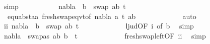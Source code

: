 \begin{isabellebody}
\ simp\isanewline
\isanewline
\ \ \ \ \ \ \ \ \ \isamarkupfalse%
\ {\isachardoublequoteopen}nabla\ {\isasymturnstile}\ b\ {\isasymsharp}\ swap\ {\isacharbrackleft}{\kern0pt}{\isacharparenleft}{\kern0pt}a{\isacharcomma}{\kern0pt}b{\isacharparenright}{\kern0pt}{\isacharbrackright}{\kern0pt}\ t{}{\isacharprime}{\kern0pt}{\isachardoublequoteclose}\ \isanewline
\ \ \ \ \ \ \ \ \ \ \ \isamarkupfalse%
\ {}{\isacharparenleft}{\kern0pt}{}{\isacharcomma}{\kern0pt}{}{\isacharcomma}{\kern0pt}{}{\isacharcomma}{\kern0pt}{}{\isacharparenright}{\kern0pt}\ equ{\isacharunderscore}{\kern0pt}abst{\isacharunderscore}{\kern0pt}aa{\isacharparenleft}{\kern0pt}{}{\isacharparenright}{\kern0pt}\ fresh{\isacharunderscore}{\kern0pt}swap{\isacharunderscore}{\kern0pt}eqvt{\isacharbrackleft}{\kern0pt}of\ nabla\ a\ t{}{\isacharprime}{\kern0pt}\ {\isacartoucheopen}{\isacharbrackleft}{\kern0pt}{\isacharparenleft}{\kern0pt}a{\isacharcomma}{\kern0pt}b{\isacharparenright}{\kern0pt}{\isacharbrackright}{\kern0pt}{\isacartoucheclose}{\isacharbrackright}{\kern0pt}\isanewline
\ \ \ \ \ \ \ \ \ \ \ \isamarkupfalse%
\ auto\isanewline
\ \ \ \ \ \ \ \ \ \isamarkupfalse%
\ \isamarkupfalse%
\ ii{\isacharcolon}{\kern0pt}\ {\isachardoublequoteopen}nabla\ {\isasymturnstile}\ b\ {\isasymsharp}\ swap\ {\isacharbrackleft}{\kern0pt}{\isacharparenleft}{\kern0pt}a{\isacharcomma}{\kern0pt}b{\isacharparenright}{\kern0pt}{\isacharbrackright}{\kern0pt}\ t{}{\isacharprime}{\kern0pt}{\isachardoublequoteclose}\isanewline
\ \ \ \ \ \ \ \ \ \ \ \isamarkupfalse%
\ l{}{\isacharunderscore}{\kern0pt}jud{\isacharbrackleft}{\kern0pt}OF\ i{\isacharcomma}{\kern0pt}\ of\ b{\isacharbrackright}{\kern0pt}\ \isamarkupfalse%
\ simp\isanewline
\ \ \ \ \ \ \ \ \ \isamarkupfalse%
\ {\isachardoublequoteopen}nabla\ {\isasymturnstile}\ swapas\ {\isacharbrackleft}{\kern0pt}{\isacharparenleft}{\kern0pt}a{\isacharcomma}{\kern0pt}b{\isacharparenright}{\kern0pt}{\isacharbrackright}{\kern0pt}\ b\ {\isasymsharp}\ t{}{\isacharprime}{\kern0pt}{\isachardoublequoteclose}\isanewline
\ \ \ \ \ \ \ \ \ \ \ \isamarkupfalse%
\ fresh{\isacharunderscore}{\kern0pt}swap{\isacharunderscore}{\kern0pt}left{\isacharbrackleft}{\kern0pt}OF\ ii{\isacharbrackright}{\kern0pt}\ \isamarkupfalse%
\ simp\isanewline
\ \ \ \ \ \ \ \ \ \isamarkupfalse%

\end{isabellebody}
